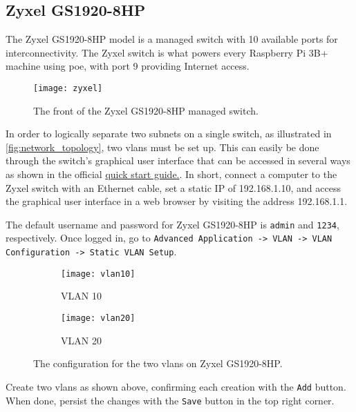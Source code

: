 \subsection{Zyxel GS1920-8HP} \label{zyxel}

The Zyxel GS1920-8HP model is a managed switch with 10 available ports for interconnectivity. The Zyxel switch is what powers every Raspberry Pi 3B+ machine using \gls{poe}, with port 9 providing Internet access.

\begin{figure}[H]
    \centering
    \texttt{[image: zyxel]}
    \captionsetup{width=1.0\linewidth}
    \caption{The front of the Zyxel GS1920-8HP managed switch.}
    \label{fig:zyxel}
\end{figure}

In order to logically separate two subnets on a single switch, as illustrated in \ref{fig:network_topology}, two \gls{vlan}s must be set up. This can easily be done through the switch's graphical user interface that can be accessed in several ways as shown in the official \href{https://www.zyxel.com/support/download_landing/product/gs1920_series_18.shtml?c=gb&l=en&pid=20130521174252&tab=Quick_Start_Guide&pname=GS1920%20Series}{quick start guide.}. In short, connect a computer to the Zyxel switch with an Ethernet cable, set a static IP of 192.168.1.10, and access the graphical user interface in a web browser by visiting the address 192.168.1.1.

The default username and password for Zyxel GS1920-8HP is \lstinline{admin} and \lstinline{1234}, respectively. Once logged in, go to \lstinline{Advanced Application -> VLAN -> VLAN Configuration -> Static VLAN Setup}.

\begin{figure}[H]
    \centering
    \begin{subfigure}{0.5\linewidth}
        \centering
        \texttt{[image: vlan10]}
        \caption{VLAN 10}
        \label{fig:vlan10}
    \end{subfigure}%
    \begin{subfigure}{0.5\linewidth}
        \centering
        \texttt{[image: vlan20]}
        \caption{VLAN 20}
        \label{fig:vlan20}
    \end{subfigure}
    \caption{The configuration for the two \gls{vlan}s on Zyxel GS1920-8HP.}
    \label{fig:vlans}
\end{figure}

Create two \gls{vlan}s as shown above, confirming each creation with the \lstinline{Add} button. When done, persist the changes with the \lstinline{Save} button in the top right corner.




